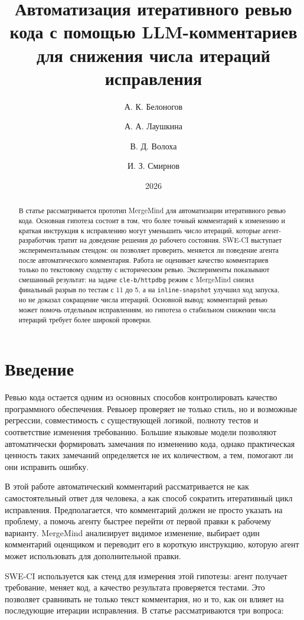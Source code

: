 \documentclass[12pt,a4paper]{article}
\title{Автоматизация итеративного ревью кода с помощью LLM-комментариев для снижения числа итераций исправления}
\author{А. К. Белоногов \and А. А. Лаушкина \and В. Д. Волоха \and И. З. Смирнов}
\date{2026}
\begin{document}
\maketitle

\begin{abstract}
В статье рассматривается прототип MergeMind для автоматизации итеративного
ревью кода. Основная гипотеза состоит в том, что более точный комментарий к
изменению и краткая инструкция к исправлению могут уменьшить число итераций,
которые агент-разработчик тратит на доведение решения до рабочего состояния.
SWE-CI выступает экспериментальным стендом: он
позволяет проверить, меняется ли поведение агента после автоматического
комментария. Работа не оценивает качество комментариев только по текстовому
сходству с историческим ревью. Эксперименты показывают смешанный результат: на
задаче \texttt{cle-b/httpdbg} режим с MergeMind снизил финальный разрыв по
тестам с 11 до 5, а на \texttt{inline-snapshot} улучшил ход запуска, но не
доказал сокращение числа итераций. Основной вывод: комментарий ревью может
помочь отдельным исправлениям, но гипотеза о стабильном снижении числа
итераций требует более широкой проверки.
\end{abstract}

\section{Введение}

Ревью кода остается одним из основных способов контролировать качество
программного обеспечения. Ревьюер проверяет не только стиль, но и возможные
регрессии, совместимость с существующей логикой, полноту тестов и соответствие
изменения требованию. Большие языковые модели позволяют автоматически
формировать замечания по изменению кода, однако практическая ценность таких
замечаний определяется не их количеством, а тем, помогают ли они исправить
ошибку.

В этой работе автоматический комментарий рассматривается не как самостоятельный
ответ для человека, а как способ сократить итеративный цикл исправления.
Предполагается, что комментарий должен не просто указать на проблему, а помочь
агенту быстрее перейти от первой правки к рабочему варианту. MergeMind
анализирует видимое изменение, выбирает один комментарий оценщиком и переводит
его в короткую инструкцию, которую агент может использовать для дополнительной
правки.

SWE-CI используется как стенд для измерения этой гипотезы: агент получает
требование, меняет код, а качество результата проверяется тестами. Это позволяет
сравнивать не только текст комментария, но и то, как он влияет на последующие
итерации исправления. В статье рассматриваются три вопроса:
\end{document}
